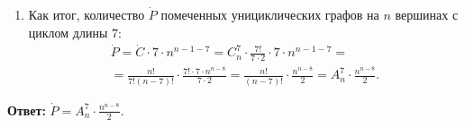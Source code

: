 \begin{solution}
\begin{enumerate}
    \item Как итог, количество \(\dot{P}\) помеченных унициклических графов на \(n\) вершинах с циклом длины \(7\):
    \begin{multline*}
        \dot{P} = \dot{C} \cdot 7 \cdot n^{n - 1 - 7} = C_{n}^{7} \cdot \frac{7!}{7 \cdot 2} \cdot 7 \cdot n^{n - 1 - 7} = \\
        = \frac{n!}{7!(n - 7)!} \cdot \frac{7! \cdot 7 \cdot n^{n - 8}}{7 \cdot 2} = \frac{n!}{(n - 7)!} \cdot \frac{n^{n - 8}}{2} = A_{n}^{7} \cdot \frac{n^{n - 8}}{2}.
    \end{multline*}
\end{enumerate}

\textbf{Ответ:} \(\displaystyle \dot{P} = A_{n}^{7} \cdot \frac{n^{n - 8}}{2}\).

\end{solution}
